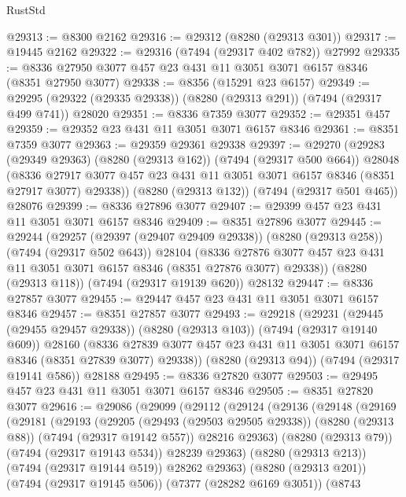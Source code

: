 \begin{lexlean}{RustStd}
\begin{coremodule}
@29313 := @8300 @2162
@29316 := @29312 (@8280 (@29313 @301))
@29317 := @19445 @2162
@29322 := @29316 (@7494 (@29317 @402 @782)) @27992
@29335 := @8336 @27950 @3077 @457 @23 @431 @11 @3051 @3071 @6157 @8346 (@8351 @27950 @3077)
@29338 := @8356 (@15291 @23 @6157)
@29349 := @29295 (@29322 (@29335 @29338)) (@8280 (@29313 @291)) (@7494 (@29317 @499 @741)) @28020
@29351 := @8336 @7359 @3077
@29352 := @29351 @457
@29359 := @29352 @23 @431 @11 @3051 @3071 @6157 @8346
@29361 := @8351 @7359 @3077
@29363 := @29359 @29361 @29338
@29397 := @29270
    (@29283
      (@29349 @29363)
      (@8280 (@29313 @162))
      (@7494 (@29317 @500 @664))
      @28048
      (@8336 @27917 @3077 @457 @23 @431 @11 @3051 @3071 @6157 @8346 (@8351 @27917 @3077) @29338))
    (@8280 (@29313 @132))
    (@7494 (@29317 @501 @465))
    @28076
@29399 := @8336 @27896 @3077
@29407 := @29399 @457 @23 @431 @11 @3051 @3071 @6157 @8346
@29409 := @8351 @27896 @3077
@29445 := @29244
    (@29257
      (@29397 (@29407 @29409 @29338))
      (@8280 (@29313 @258))
      (@7494 (@29317 @502 @643))
      @28104
      (@8336 @27876 @3077 @457 @23 @431 @11 @3051 @3071 @6157 @8346 (@8351 @27876 @3077) @29338))
    (@8280 (@29313 @118))
    (@7494 (@29317 @19139 @620))
    @28132
@29447 := @8336 @27857 @3077
@29455 := @29447 @457 @23 @431 @11 @3051 @3071 @6157 @8346
@29457 := @8351 @27857 @3077
@29493 := @29218
    (@29231
      (@29445 (@29455 @29457 @29338))
      (@8280 (@29313 @103))
      (@7494 (@29317 @19140 @609))
      @28160
      (@8336 @27839 @3077 @457 @23 @431 @11 @3051 @3071 @6157 @8346 (@8351 @27839 @3077) @29338))
    (@8280 (@29313 @94))
    (@7494 (@29317 @19141 @586))
    @28188
@29495 := @8336 @27820 @3077
@29503 := @29495 @457 @23 @431 @11 @3051 @3071 @6157 @8346
@29505 := @8351 @27820 @3077
@29616 := @29086
    (@29099
      (@29112
        (@29124
          (@29136
            (@29148
              (@29169
                (@29181
                  (@29193
                    (@29205
                      (@29493 (@29503 @29505 @29338))
                      (@8280 (@29313 @88))
                      (@7494 (@29317 @19142 @557))
                      @28216
                      @29363)
                    (@8280 (@29313 @79))
                    (@7494 (@29317 @19143 @534))
                    @28239
                    @29363)
                  (@8280 (@29313 @213))
                  (@7494 (@29317 @19144 @519))
                  @28262
                  @29363)
                (@8280 (@29313 @201))
                (@7494 (@29317 @19145 @506))
                (@7377 (@28282 @6169 @3051))
                (@8743

\end{coremodule}
\end{lexlean}
